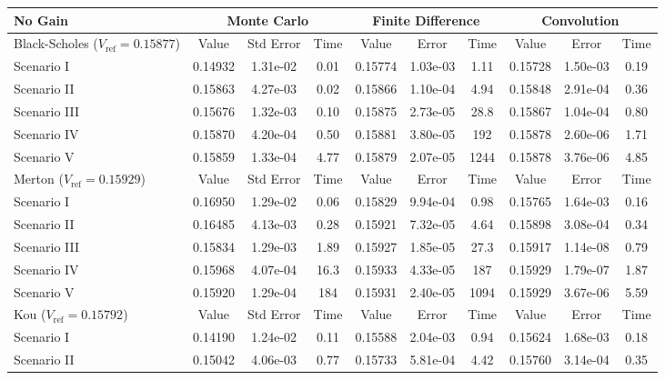 \begin{table}
\centering
  \begin{tabular}{l||c|c|c||c|c|c||c|c|c}
    \toprule
    \textbf{No Gain} & \multicolumn{3}{c||}{\textbf{Monte Carlo}} & \multicolumn{3}{c||}{\textbf{Finite Difference}} & \multicolumn{3}{c}{\textbf{Convolution}} \\
    \toprule
    Black-Scholes ($V_\text{ref}= 0.15877$) & Value & Std Error  & Time & Value & Error & Time & Value & Error & Time \\
      \midrule
    Scenario I   & 0.14932 & 1.31e-02 & 0.01 & 0.15774 & 1.03e-03 & 1.11 & 0.15728 & 1.50e-03 & 0.19 \\
    Scenario II  & 0.15863 & 4.27e-03 & 0.02 & 0.15866 & 1.10e-04 & 4.94 & 0.15848 & 2.91e-04 & 0.36 \\
    Scenario III & 0.15676 & 1.32e-03 & 0.10 & 0.15875 & 2.73e-05 & 28.8 & 0.15867 & 1.04e-04 & 0.80 \\
    Scenario IV  & 0.15870 & 4.20e-04 & 0.50 & 0.15881 & 3.80e-05 & 192  & 0.15878 & 2.60e-06 & 1.71 \\
    Scenario V   & 0.15859 & 1.33e-04 & 4.77 & 0.15879 & 2.07e-05 & 1244 & 0.15878 & 3.76e-06 & 4.85 \\
     \midrule
      Merton ($V_\text{ref}=0.15929$) & Value & Std Error  & Time & Value & Error & Time & Value & Error & Time \\
      \midrule
    Scenario I   & 0.16950 & 1.29e-02 & 0.06 & 0.15829 & 9.94e-04 & 0.98 & 0.15765 & 1.64e-03 & 0.16\\
    Scenario II  & 0.16485 & 4.13e-03 & 0.28 & 0.15921 & 7.32e-05 & 4.64 & 0.15898 & 3.08e-04 & 0.34\\
    Scenario III & 0.15834 & 1.29e-03 & 1.89 & 0.15927 & 1.85e-05 & 27.3 & 0.15917 & 1.14e-08 & 0.79\\
    Scenario IV  & 0.15968 & 4.07e-04 & 16.3 & 0.15933 & 4.33e-05 & 187  & 0.15929 & 1.79e-07 & 1.87\\
    Scenario V   & 0.15920 & 1.29e-04 & 184  & 0.15931 & 2.40e-05 & 1094 & 0.15929 & 3.67e-06 & 5.59\\
     \midrule
      Kou ($V_\text{ref}=0.15792$) & Value & Std Error  & Time & Value & Error & Time & Value & Error & Time \\
      \midrule
    Scenario I   & 0.14190 & 1.24e-02 & 0.11 & 0.15588 & 2.04e-03 & 0.94 & 0.15624 & 1.68e-03 & 0.18 \\
    Scenario II  & 0.15042 & 4.06e-03 & 0.77 & 0.15733 & 5.81e-04 & 4.42 & 0.15760 & 3.14e-04 & 0.35 \\

\end{tabular}
\end{table}
